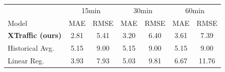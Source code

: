 \begin{tabular}{lcccccc}
\toprule
& \multicolumn{2}{c}{15min} & \multicolumn{2}{c}{30min} & \multicolumn{2}{c}{60min} \\
Model & MAE & RMSE & MAE & RMSE & MAE & RMSE \\
\midrule
\textbf{XTraffic (ours)} & 2.81 & 5.41 & 3.20 & 6.40 & 3.61 & 7.39 \\
Historical Avg. & 5.15 & 9.00 & 5.15 & 9.00 & 5.15 & 9.00 \\
Linear Reg. & 3.93 & 7.93 & 5.03 & 9.81 & 6.67 & 11.76 \\
\bottomrule
\end{tabular}
